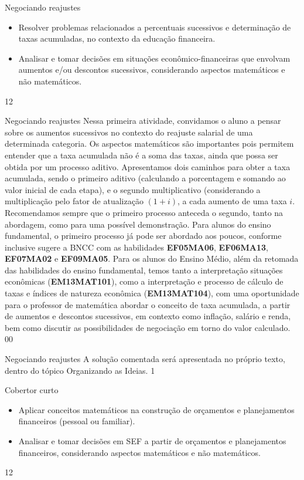\clearpage
\begin{objectives}{Negociando reajustes}
{
\begin{itemize}
\item Resolver problemas relacionados a percentuais sucessivos e determinação de taxas acumuladas, no contexto da educação financeira.
\item Analisar e tomar decisões em situações econômico-financeiras que envolvam aumentos e/ou descontos sucessivos, considerando aspectos matemáticos e não matemáticos.
\end{itemize}
}{1}{2}
\end{objectives}
\begin{sugestions}{Negociando reajustes}
{
Nessa primeira atividade, convidamos o aluno a pensar sobre os aumentos sucessivos no contexto do reajuste salarial de uma determinada categoria. Os aspectos matemáticos são importantes pois permitem entender que a taxa acumulada não é a soma das taxas, ainda que possa ser obtida por um processo aditivo. Apresentamos dois caminhos para obter a taxa acumulada, sendo o primeiro aditivo (calculando a porcentagem e somando ao valor inicial de cada etapa), e o segundo multiplicativo (considerando a multiplicação pelo fator de atualização $(1+i)$, a cada aumento de uma taxa $i$. Recomendamos sempre que o primeiro processo anteceda o segundo, tanto na abordagem, como para uma possível demonstração. Para alunos do ensino fundamental, o primeiro processo já pode ser abordado aos poucos, conforme inclusive sugere a BNCC com as habilidades \textbf{EF05MA06}, \textbf{EF06MA13}, \textbf{EF07MA02} e \textbf{EF09MA05}. Para os alunos do Ensino Médio, além da retomada das habilidades do ensino fundamental, temos tanto a interpretação situações econômicas (\textbf{EM13MAT101}), como a interpretação e processo de cálculo de taxas e índices de natureza econômica (\textbf{EM13MAT104}), com uma oportunidade para o professor de matemática abordar o conceito de taxa acumulada, a partir de aumentos e descontos sucessivos, em contexto como inflação, salário e renda, bem como discutir as possibilidades de negociação em torno do valor calculado. 
}{0}{0}
\end{sugestions}
\marginpar{\vspace{.5em}}
\begin{answer}{Negociando reajustes}
{
A solução comentada será apresentada no próprio texto, dentro do tópico Organizando as Ideias.
}{1}
\end{answer}
\begin{objectives}{Cobertor curto}
{
\begin{itemize}
\item Aplicar conceitos matemáticos na construção de orçamentos e planejamentos financeiros (pessoal ou familiar).
\item Analisar e tomar decisões em SEF a partir de orçamentos e planejamentos financeiros, considerando aspectos matemáticos e não matemáticos.
\end{itemize}

}{1}{2}
\end{objectives}
